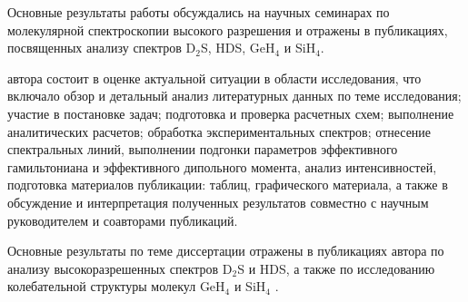 {\probation} Основные результаты работы обсуждались на научных семинарах по молекулярной
спектроскопии высокого разрешения и отражены в публикациях, посвященных анализу спектров D$_2$S,
HDS, GeH$_4$ и SiH$_4$. %

{\contribution} автора состоит в оценке актуальной ситуации в области исследования, 
что включало обзор и детальный анализ литературных данных по
теме исследования; участие в постановке задач; подготовка и проверка расчетных
схем; выполнение аналитических расчетов; обработка экспериментальных спектров; 
отнесение спектральных линий, выполнении подгонки параметров эффективного гамильтониана и эффективного
дипольного момента, анализ интенсивностей, подготовка материалов публикации: таблиц,
графического материала, а также в обсуждение и интерпретация полученных
результатов совместно с научным руководителем и соавторами публикаций.

{\publications} Основные результаты по теме диссертации отражены в публикациях автора по анализу
высокоразрешенных спектров D$_2$S и HDS, а также по исследованию колебательной структуры молекул
GeH$_4$ и SiH$_4$ \cite{d2s_sydow2019,hds_sydow2019,ulen1,ulen2}. %
